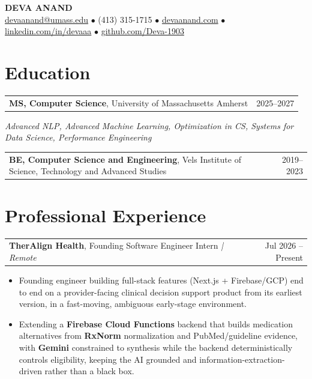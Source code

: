 \documentclass[letterpaper,11pt]{article}
\makeatletter
\newcommand{\eduItem}[3]{%
  \begin{tabular*}{\textwidth}{@{}l@{\extracolsep{\fill}}r@{}}
    \textbf{#1}, #2 & #3 \\
  \end{tabular*}\par
}
\newcommand{\expItem}[4]{%
  \vspace{2pt}
  \begin{tabular*}{\textwidth}{@{}l@{\extracolsep{\fill}}r@{}}
    \textbf{#1}, #2 \textit{| #3} & #4 \\
  \end{tabular*}\par\vspace{-3pt}
}
\makeatother
\begin{document}
\begin{center}
    {\fontsize{18}{20}\selectfont\bfseries DEVA ANAND}\\ \vspace{3pt}
    {\small
    \href{mailto:devaanand@umass.edu}{devaanand@umass.edu}
    \enspace$\bullet$\enspace
    (413) 315-1715
    \enspace$\bullet$\enspace
    \href{https://devaanand.com}{devaanand.com}
    \enspace$\bullet$\enspace
    \href{https://linkedin.com/in/devaaa/}{linkedin.com/in/devaaa}
    \enspace$\bullet$\enspace
    \href{https://github.com/Deva-1903}{github.com/Deva-1903}}
\end{center}
\vspace{-8pt}

\section{Education}
\eduItem{MS, Computer Science}{University of Massachusetts Amherst}{2025--2027}
{\small\textit{Advanced NLP, Advanced Machine Learning, Optimization in CS, Systems for Data Science, Performance Engineering}}\par
\vspace{3pt}
\eduItem{BE, Computer Science and Engineering}{Vels Institute of Science, Technology and Advanced Studies}{2019--2023}

\section{Professional Experience}

\expItem{TherAlign Health}{Founding Software Engineer Intern}{Remote}{Jul 2026 -- Present}
\begin{itemize}
  \item Founding engineer building full-stack features (Next.js + Firebase/GCP) end to end on a provider-facing clinical decision support product from its earliest version, in a fast-moving, ambiguous early-stage environment.
  \item Extending a \textbf{Firebase Cloud Functions} backend that builds medication alternatives from \textbf{RxNorm} normalization and PubMed/guideline evidence, with \textbf{Gemini} constrained to synthesis while the backend deterministically controls eligibility, keeping the AI grounded and information-extraction-driven rather than a black box.
\end{itemize}
\end{document}
